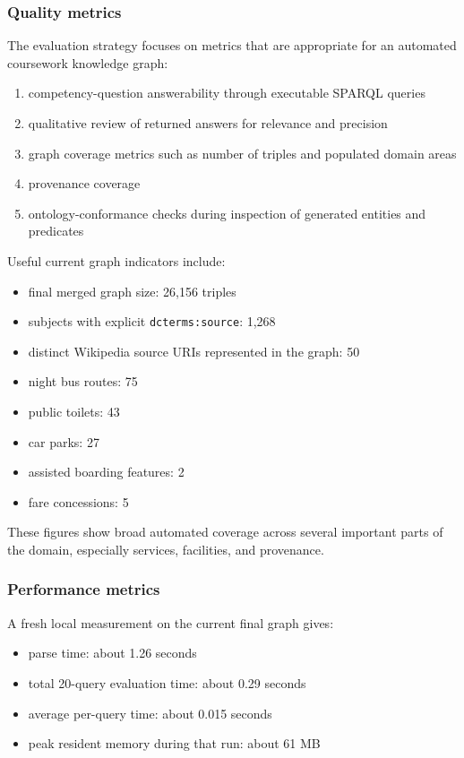 \documentclass[
  11pt,
  a4paper,
]{article}
\providecommand{\tightlist}{%
  \setlength{\itemsep}{0pt}\setlength{\parskip}{0pt}}
\begin{document}
\subsubsection{Quality metrics}\label{quality-metrics}

The evaluation strategy focuses on metrics that are appropriate for an
automated coursework knowledge graph:

\begin{enumerate}
\def\labelenumi{\arabic{enumi}.}
\tightlist
\item
  competency-question answerability through executable SPARQL queries
\item
  qualitative review of returned answers for relevance and precision
\item
  graph coverage metrics such as number of triples and populated domain
  areas
\item
  provenance coverage
\item
  ontology-conformance checks during inspection of generated entities
  and predicates
\end{enumerate}

Useful current graph indicators include:

\begin{itemize}
\tightlist
\item
  final merged graph size: 26,156 triples
\item
  subjects with explicit \texttt{dcterms:source}: 1,268
\item
  distinct Wikipedia source URIs represented in the graph: 50
\item
  night bus routes: 75
\item
  public toilets: 43
\item
  car parks: 27
\item
  assisted boarding features: 2
\item
  fare concessions: 5
\end{itemize}

These figures show broad automated coverage across several important
parts of the domain, especially services, facilities, and provenance.

\subsubsection{Performance metrics}\label{performance-metrics}

A fresh local measurement on the current final graph gives:

\begin{itemize}
\tightlist
\item
  parse time: about 1.26 seconds
\item
  total 20-query evaluation time: about 0.29 seconds
\item
  average per-query time: about 0.015 seconds
\item
  peak resident memory during that run: about 61 MB
\end{itemize}
\end{document}
